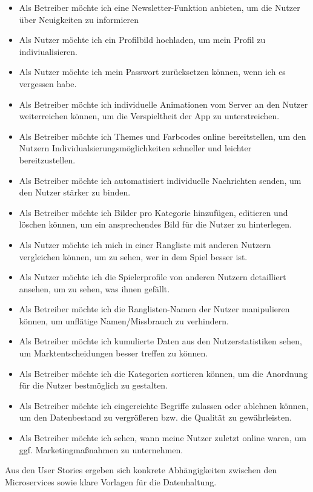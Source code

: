 {\begin{itemize}
	\item Als Betreiber möchte ich eine Newsletter-Funktion anbieten, um die Nutzer über Neuigkeiten zu informieren
	\item Als Nutzer möchte ich ein Profilbild hochladen, um mein Profil zu indiviualisieren.
	\item Als Nutzer möchte ich mein Passwort zurücksetzen können, wenn ich es vergessen habe. 
	\item Als Betreiber möchte ich individuelle Animationen vom Server an den Nutzer weiterreichen können, um die Verspieltheit der App zu unterstreichen.
	\item Als Betreiber möchte ich Themes und Farbcodes online bereitstellen, um den Nutzern Individualsierungsmöglichkeiten schneller und leichter bereitzustellen.
	\item Als Betreiber möchte ich automatisiert individuelle Nachrichten senden, um den Nutzer stärker zu binden.
	\item Als Betreiber möchte ich Bilder pro Kategorie hinzufügen, editieren und löschen können, um ein ansprechendes Bild für die Nutzer zu hinterlegen.
	\item Als Nutzer möchte ich mich in einer Rangliste mit anderen Nutzern vergleichen können, um zu sehen, wer in dem Spiel besser ist.
	\item Als Nutzer möchte ich die Spielerprofile von anderen Nutzern detailliert ansehen, um zu sehen, was ihnen gefällt. 
	\item Als Betreiber möchte ich die Ranglisten-Namen der Nutzer manipulieren können, um unflätige Namen/Missbrauch zu verhindern.
	\item Als Betreiber möchte ich kumulierte Daten aus den Nutzerstatistiken sehen, um Marktentscheidungen besser treffen zu können.
	\item Als Betreiber möchte ich die Kategorien sortieren können, um die Anordnung für die Nutzer bestmöglich zu gestalten.
	\item Als Betreiber möchte ich eingereichte Begriffe zulassen oder ablehnen können, um den Datenbestand zu vergrößeren bzw. die Qualität zu gewährleisten.
	\item Als Betreiber möchte ich sehen, wann meine Nutzer zuletzt online waren, um ggf. Marketingmaßnahmen zu unternehmen.
	
\end{itemize}

Aus den User Stories ergeben sich konkrete Abhängigkeiten zwischen den Microservices sowie klare Vorlagen für die Datenhaltung.

}
